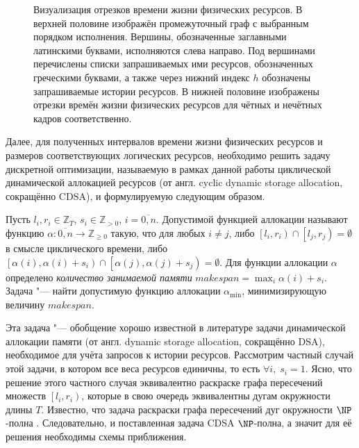 \begin{figure*}[ht]
\caption{Визуализация отрезков времени жизни физических ресурсов.
В верхней половине изображён промежуточный граф с выбранным порядком исполнения.
Вершины, обозначенные заглавными латинскими буквами, исполняются слева направо.
Под вершинами перечислены списки запрашиваемых ими ресурсов, обозначенных греческими буквами, а также через нижний индекс $h$ обозначены запрашиваемые истории ресурсов.
В нижней половине изображены отрезки времён жизни физических ресурсов для чётных и нечётных кадров соответственно.}
\label{fig:twoFrameLifetime}
\end{figure*}
Далее, для полученных интервалов времени жизни физических ресурсов и размеров соответствующих логических ресурсов, необходимо решить задачу дискретной оптимизации, называемую в рамках данной работы циклической динамической аллокацией ресурсов (от англ. cyclic dynamic storage allocation, сокращённо CDSA), и формулируемую следующим образом.

Пусть $l_i, r_i \in \mathbb{Z}_T$, $s_i \in \mathbb{Z}_{>0}$, $i=\overline{0,n}$.
Допустимой функцией аллокации называют функцию $\alpha : \overline{0,n} \to \mathbb{Z}_{\geqslant 0}$ такую, что для любых $i \neq j$, либо $\left[l_i, r_i\right) \cap \left[l_j, r_j\right) = \emptyset$ в смысле циклического времени, либо $\left[\alpha(i), \alpha(i) + s_i\right) \cap \left[\alpha(j), \alpha(j) + s_j\right) = \emptyset$.
Для функции аллокации $\alpha$ определено \textit{количество занимаемой памяти} $makespan = \max_i \alpha(i) + s_i$.
Задача "--- найти допустимую функцию аллокации $\alpha_{\min}$, минимизирующую величину $makespan$.

Эта задача "--- обобщение хорошо известной в литературе задачи динамической аллокации памяти (от англ. dynamic storage allocation, сокращённо DSA), необходимое для учёта запросов к истории ресурсов.
Рассмотрим частный случай этой задачи, в котором все веса ресурсов единичны, то есть $\forall i,\;s_i = 1$.
Ясно, что решение этого частного случая эквивалентно раскраске графа пересечений множеств $\left[l_i, r_i\right)$, которые в свою очередь эквивалентны дугам окружности длины $T$.
Известно, что задача раскраски графа пересечений дуг окружности $\NP$-полна \cite{doi:10.1137/0601025}.
Следовательно, и поставленная задача CDSA $\NP$-полна, а значит для её решения необходимы схемы приближения.

